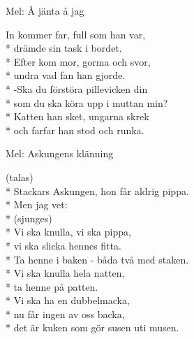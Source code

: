 \begin{SongText}
    \begin{SongInfo}
        Mel: Å jänta å jag
    \end{SongInfo}
    \begin{SongVerse}
        In kommer far, full som han var,\\*%
        drämde sin task i bordet.\\*%
        Efter kom mor, gorma och svor,\\*%
        undra vad fan han gjorde.\\*%
        -Ska du förstöra pillevicken din\\*%
        som du ska köra upp i muttan min?\\*%
        Katten han sket, ungarna skrek\\*%
        och farfar han stod och runka.
    \end{SongVerse}
\end{SongText}
\begin{SongText}
    \begin{SongInfo}
        Mel: Askungens klänning
    \end{SongInfo}
    \begin{SongVerse}
        (talas)\\*%
        Stackars Askungen, hon får aldrig pippa.\\*%
        Men jag vet:\\*%
        (sjunges)\\*%
        Vi ska knulla, vi ska pippa,\\*%
        vi ska slicka hennes fitta.\\*%
        Ta henne i baken - båda två med staken.\\*%
        Vi ska knulla hela natten,\\*%
        ta henne på patten.\\*%
        Vi ska ha en dubbelmacka,\\*%
        nu får ingen av oss backa,\\*%
        det är kuken som gör susen uti musen.
    \end{SongVerse}
\end{SongText}
